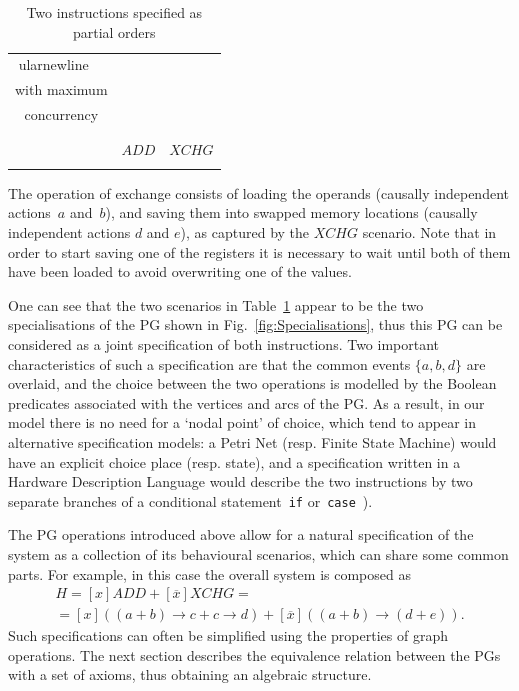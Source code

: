 \begin{table}
\begin{tabular}{||c||||c||||c||c||}
ularnewline
\multicolumn{2}{||c||||}{scenario} &  & \tabularnewline
\multicolumn{2}{||c||||}{with maximum} &  & \tabularnewline
\multicolumn{2}{||c||||}{concurrency} &  & \tabularnewline
\multicolumn{2}{||c||||}{} &  & \tabularnewline
\multicolumn{2}{||c||||}{} &  & \tabularnewline
\multicolumn{2}{||c||||}{} & $\mathit{ADD}$ & $\mathit{XCHG}$\tabularnewline
\multicolumn{2}{||c||||}{} &  & \tabularnewline
\hline 
\end{tabular}

\caption{\label{tab-two-operations}Two instructions specified as partial orders}
\end{table}


The operation of exchange consists of loading the operands (causally
independent actions~$a$ and~$b$), and saving them into swapped
memory locations (causally independent actions $d$ and $e$), as
captured by the $\mathit{XCHG}$ scenario. Note that in order to start
saving one of the registers it is necessary to wait until both of
them have been loaded to avoid overwriting one of the values.

One can see that the two scenarios in Table~\ref{tab-two-operations}
appear to be the two specialisations of the PG shown in Fig.~\ref{fig:Specialisations},
thus this PG can be considered as a joint specification of both instructions.
Two important characteristics of such a specification are that the
common events $\{a,b,d\}$ are overlaid, and the choice between the
two operations is modelled by the Boolean predicates associated with
the vertices and arcs of the PG. As a result, in our model there is
no need for a `nodal point' of choice, which tend to appear in alternative
specification models: a Petri Net (resp. Finite State Machine) would
have an explicit choice place (resp. state), and a specification written
in a Hardware Description Language would describe the two instructions
by two separate branches of a conditional statement~\texttt{if} or~\texttt{case}~\cite{1994_de_micheli_book}).

The PG operations introduced above allow for a natural specification
of the system as a collection of its behavioural scenarios, which
can share some common parts. For example, in this case the overall
system is composed as
\begin{equation}
\begin{array}{c}
H=[x]ADD+[\overline{x}]XCHG=\\
=\![x]((a\!+\! b)\!\rightarrow\! c\!+\! c\!\rightarrow\! d)\!+\![\overline{x}]((a\!+\! b)\!\rightarrow\!(d\!+\! e)).
\end{array}\label{eq:H_ADD_XCHG}
\end{equation}
Such specifications can often be simplified using the properties of
graph operations. The next section describes the equivalence relation
between the PGs with a set of axioms, thus obtaining an algebraic structure.


